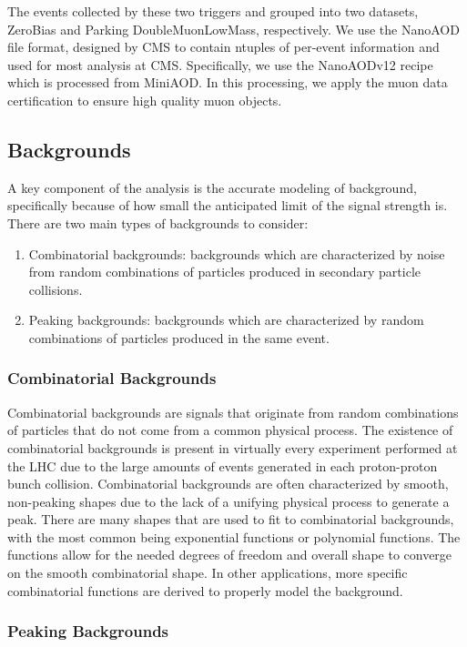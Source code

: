 The events collected by these two triggers and grouped into two datasets, ZeroBias and Parking DoubleMuonLowMass, respectively. We use the NanoAOD file format, designed by CMS to contain ntuples of per-event information and used for most analysis at CMS. Specifically, we use the NanoAODv12 recipe which is processed from MiniAOD. In this processing, we apply the muon data certification to ensure high quality muon objects. 

\subsection{Backgrounds}
\label{subsec:backgrounds}

A key component of the analysis is the accurate modeling of background, specifically because of how small the anticipated limit of the signal strength is. There are two main types of backgrounds to consider: 
\begin{enumerate}
    \item Combinatorial backgrounds: backgrounds which are characterized by noise from random combinations of particles produced in secondary particle collisions. 
    \item Peaking backgrounds: backgrounds which are characterized by random combinations of particles produced in the same event.
\end{enumerate}

\subsubsection{Combinatorial Backgrounds}

Combinatorial backgrounds are signals that originate from random combinations of particles that do not come from a common physical process. The existence of combinatorial backgrounds is present in virtually every experiment performed at the LHC due to the large amounts of events generated in each proton-proton bunch collision. Combinatorial backgrounds are often characterized by smooth, non-peaking shapes due to the lack of a unifying physical process to generate a peak. There are many shapes that are used to fit to combinatorial backgrounds, with the most common being exponential functions or polynomial functions. The functions allow for the needed degrees of freedom and overall shape to converge on the smooth combinatorial shape. In other applications, more specific combinatorial functions are derived to properly model the background. 

\subsubsection{Peaking Backgrounds}

